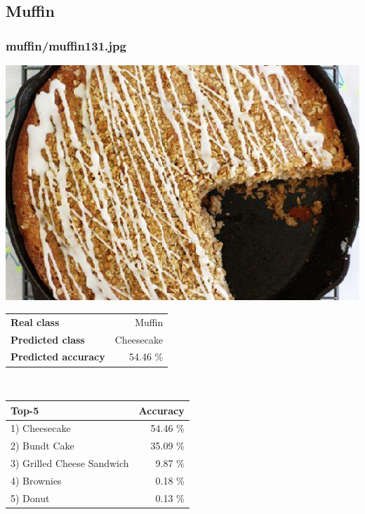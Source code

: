 \subsection{Muffin}
    
\subsubsection{muffin/muffin131.jpg}

\begin{minipage}[t]{0.4\textwidth}
	\vspace{0pt}
	\includegraphics[width=\linewidth]{images/evaluation-images/muffin/muffin131.jpg}
\end{minipage}
\hfill
\begin{minipage}[t]{0.5\textwidth}
	\vspace{0pt}\raggedright
	\begin{tabularx}{\textwidth}{X r}
		\small \textbf{Real class} & \small Muffin\\
		\small \textbf{Predicted class} & \small Cheesecake\\
		\small \textbf{Predicted accuracy} & \small 54.46 \%
    \end{tabularx}\\
    
    \vspace{6pt}
	\begin{tabularx}{\textwidth}{X r}
        \small \textbf{Top-5} & \small \textbf{Accuracy} \\
        \hline
		\small 1) Cheesecake & \small 54.46 \%\\\small 2) Bundt Cake & \small 35.09 \%\\\small 3) Grilled Cheese Sandwich & \small 9.87 \%\\\small 4) Brownies & \small 0.18 \%\\\small 5) Donut & \small 0.13 \%
    \end{tabularx}
\end{minipage}
    
